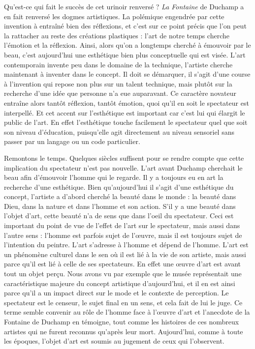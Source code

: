 
 Qu'est-ce qui fait le succès de cet urinoir renversé ? \emph{La Fontaine} de Duchamp a en fait renversé les dogmes artistiques. La polémique engendrée par cette invention à entraîné bien des réflexions, et c'est sur ce point précis que l'on peut la rattacher au reste des créations plastiques : l'art de notre temps cherche l'émotion et la réflexion. Ainsi, alors qu'on a longtemps cherché à émouvoir par le beau, c'est aujourd'hui une esthétique bien plus conceptuelle qui est visée. L'art contemporain invente peu dans le domaine de la technique, l'artiste cherche maintenant à inventer dans le concept. Il doit se démarquer, il s'agit d'une course à l'invention qui repose non plus sur un talent technique, mais plutôt sur la recherche d'une idée que personne n'a eue auparavant. Ce caractère novateur entraîne alors tantôt réflexion, tantôt émotion, quoi qu'il en soit le spectateur est interpellé. Et cet accent sur l’esthétique est important car c’est lui qui élargit le public de l’art. En effet l’esthétique touche facilement le spectateur quel que soit son niveau d’éducation, puisqu’elle agit directement au niveau sensoriel sans passer par un langage ou un code particulier.

\xspace
	Remontons le temps. Quelques siècles suffisent pour se rendre compte que cette implication du spectateur n'est pas nouvelle. L'art avant Duchamp cherchait le beau afin d'émouvoir l'homme qui le regarde. Il y a toujours eu en art la recherche d'une esthétique. Bien qu'aujourd’hui il s'agit d'une esthétique du concept, l'artiste a d'abord cherché la beauté dans le monde : la beauté dans Dieu, dans la nature et dans l'homme et son action. S'il y a une beauté dans l'objet d'art, cette beauté n'a de sens que dans l'oeil du spectateur. Ceci est important du point de vue de l'effet de l'art sur le spectateur, mais aussi dans l'autre sens : l'homme est parfois sujet de l'\oe{}uvre, mais il est toujours sujet de l'intention du peintre. L'art s'adresse à l'homme et dépend de l'homme. L'art est un phénomène culturel dans le sen où il est lié à la vie de son artiste, mais aussi parce qu’il est lié à celle de ses spectateurs. En effet une \oe{}uvre d'art est avant tout un objet perçu. Nous avons vu par exemple que le musée représentait une caractéristique majeure du concept artistique d'aujourd'hui, et il en est ainsi parce qu'il a un impact direct sur le mode et le contexte de perception. Le spectateur est le censeur, le sujet final en un sens, et cela fait de lui le juge. Ce terme semble convenir au rôle de l'homme face à l'\oe{}uvre d'art et l'anecdote de la Fontaine de Duchamp en témoigne, tout comme les histoires de ces nombreux artistes qui ne furent reconnus qu'après leur mort. Aujourd'hui, comme à toute les époques, l'objet d'art est soumis au jugement de ceux qui l'observent. 

